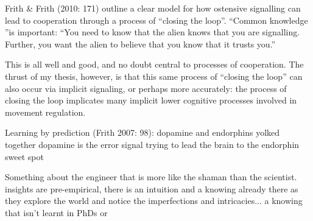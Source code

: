 Frith  & Frith (2010: 171) outline a clear model for how ostensive signalling can lead to cooperation through a process of ``closing the loop''.  ``Common knowledge ''is important:
``You need to know that the alien knows that you are signalling. Further, you want the alien to believe that you know that it trusts you.''

This is all well and good, and no doubt central to processes of cooperation.  The thrust of my thesis, however, is that this same process of ``closing the loop'' can also occur via implicit signaling, or perhaps more accurately: the process of closing the loop implicates many implicit lower cognitive processes involved in movement regulation.


Learning by prediction (Frith 2007: 98): dopamine and endorphins yolked together
dopamine is the error signal trying to lead the brain to the endorphin sweet spot


Something about the engineer that is more like the shaman than the scientist.  insights are pre-empirical, there is an intuition and a knowing already there as they explore the world and notice the imperfections and intricacies... a knowing that isn't learnt in PhDs or

